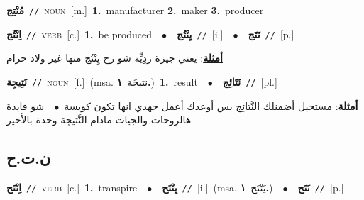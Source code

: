 \documentclass[10pt,a4paper,twoside]{article} %
\begin{document}
\begin{multicols}{2}
{{{{{{{{{\setlength\topsep{0pt}\textbf{\foreignlanguage{arabic}{مُنْتِج}}\ {\color{gray}\texttt{//}\color{black}}\ \textsc{noun}\ [m.]\ \textbf{1.}~manufacturer  \textbf{2.}~maker  \textbf{3.}~producer\ 

{\setlength\topsep{0pt}\textbf{\foreignlanguage{arabic}{اِنْتُج}}\ {\color{gray}\texttt{//}\color{black}}\ \textsc{verb}\ [c.]\ \textbf{1.}~be produced\ \ $\bullet$\ \ \setlength\topsep{0pt}\textbf{\foreignlanguage{arabic}{يِنْتُج}}\ {\color{gray}\texttt{//}\color{black}}\ [i.]\ \ $\bullet$\ \ \setlength\topsep{0pt}\textbf{\foreignlanguage{arabic}{نَتَج}}\ {\color{gray}\texttt{//}\color{black}}\ [p.]\  \begin{flushright}\color{gray}\foreignlanguage{arabic}{\textbf{\underline{\foreignlanguage{arabic}{أمثلة}}}: يعني جيزة ردِيِّة شو رح يِنْتُج منها غير ولاد حرام}\end{flushright}\color{black}} \vspace{2mm}

{\setlength\topsep{0pt}\textbf{\foreignlanguage{arabic}{نَتِيجِة}}\ {\color{gray}\texttt{//}\color{black}}\ \textsc{noun}\ [f.]\ \color{gray}(msa. \foreignlanguage{arabic}{نتيجَة}~\foreignlanguage{arabic}{\textbf{١.}})\color{black}\ \textbf{1.}~result\ \ $\bullet$\ \ \setlength\topsep{0pt}\textbf{\foreignlanguage{arabic}{نَتَائِج}}\ {\color{gray}\texttt{//}\color{black}}\ [pl.]\  \begin{flushright}\color{gray}\foreignlanguage{arabic}{\textbf{\underline{\foreignlanguage{arabic}{أمثلة}}}: مستحيل أضمنلك النَّتائِج بس أوعدك أعمل جهدي انها تكون كويسة\ $\bullet$\ \  شو فايدة هالروحات والجيات مادام النَّتيجِة وحدة بالأخير}\end{flushright}\color{black}} \vspace{2mm}

\vspace{-3mm}
\subsection*{\color{blue}\foreignlanguage{arabic}{ن.ت.ح}\color{blue}{}} 

{\setlength\topsep{0pt}\textbf{\foreignlanguage{arabic}{اِنْتَح}}\ {\color{gray}\texttt{//}\color{black}}\ \textsc{verb}\ [c.]\ \textbf{1.}~transpire\ \ $\bullet$\ \ \setlength\topsep{0pt}\textbf{\foreignlanguage{arabic}{يِنْتَح}}\ {\color{gray}\texttt{//}\color{black}}\ [i.]\ \color{gray}(msa. \foreignlanguage{arabic}{يَنْتَح}~\foreignlanguage{arabic}{\textbf{١.}})\color{black}\ \ $\bullet$\ \ \setlength\topsep{0pt}\textbf{\foreignlanguage{arabic}{نَتَح}}\ {\color{gray}\texttt{//}\color{black}}\ [p.]\ 

}}}}}}}}}}
\end{multicols}
\end{document}
